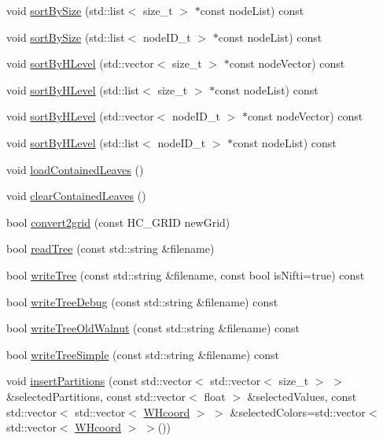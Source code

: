 \begin{DoxyCompactItemize}
\item 
void \hyperlink{classWHtree_aeda84a0333ad08114f1403a380263188}{sort\-By\-Size} (std\-::list$<$ size\-\_\-t $>$ $\ast$const node\-List) const 
\item 
void \hyperlink{classWHtree_a4e9421fbe40ad68332457c7ad7ec1f1a}{sort\-By\-Size} (std\-::list$<$ node\-I\-D\-\_\-t $>$ $\ast$const node\-List) const 
\item 
void \hyperlink{classWHtree_a9513c31ac9cf391009d7dcda6aa96b0d}{sort\-By\-H\-Level} (std\-::vector$<$ size\-\_\-t $>$ $\ast$const node\-Vector) const 
\item 
void \hyperlink{classWHtree_a3b9f8ca446fce05d2b6d3503995a46e4}{sort\-By\-H\-Level} (std\-::list$<$ size\-\_\-t $>$ $\ast$const node\-List) const 
\item 
void \hyperlink{classWHtree_afeb0ff1c414bbb5f4ca929efc384e6b5}{sort\-By\-H\-Level} (std\-::vector$<$ node\-I\-D\-\_\-t $>$ $\ast$const node\-Vector) const 
\item 
void \hyperlink{classWHtree_a2598f2fcb0bfabd171f9859f51a2c0dc}{sort\-By\-H\-Level} (std\-::list$<$ node\-I\-D\-\_\-t $>$ $\ast$const node\-List) const 
\item 
void \hyperlink{classWHtree_a0f338c613960d45d80f6330dddbbb074}{load\-Contained\-Leaves} ()
\item 
void \hyperlink{classWHtree_a9ba656617bb3102c20f0771afa42bf04}{clear\-Contained\-Leaves} ()
\item 
bool \hyperlink{classWHtree_adbb0438fc5e1f0093a123a0e5c702888}{convert2grid} (const \-H\-C\-\_\-\-G\-R\-I\-D new\-Grid)
\item 
bool \hyperlink{classWHtree_aec015736c955a615f6b610f9a639309a}{read\-Tree} (const std\-::string \&filename)
\item 
bool \hyperlink{classWHtree_aba706369b101c3f42cd7a48e93ca8f54}{write\-Tree} (const std\-::string \&filename, const bool is\-Nifti=true) const 
\item 
bool \hyperlink{classWHtree_a224a9ec0a9e14105404a393d9f42fc2b}{write\-Tree\-Debug} (const std\-::string \&filename) const 
\item 
bool \hyperlink{classWHtree_a3e7b5ac0129cfef78438c037c8793cd8}{write\-Tree\-Old\-Walnut} (const std\-::string \&filename) const 
\item 
bool \hyperlink{classWHtree_a3deb538945b6e294e79d7e3faf264423}{write\-Tree\-Simple} (const std\-::string \&filename) const 
\item 
void \hyperlink{classWHtree_a5768ec8e7fc61966ab65fc3c0ed38bda}{insert\-Partitions} (const std\-::vector$<$ std\-::vector$<$ size\-\_\-t $>$ $>$ \&selected\-Partitions, const std\-::vector$<$ float $>$ \&selected\-Values, const std\-::vector$<$ std\-::vector$<$ \hyperlink{classWHcoord}{\-W\-Hcoord} $>$ $>$ \&selected\-Colors=std\-::vector$<$ std\-::vector$<$ \hyperlink{classWHcoord}{\-W\-Hcoord} $>$ $>$())

\end{DoxyCompactItemize}
